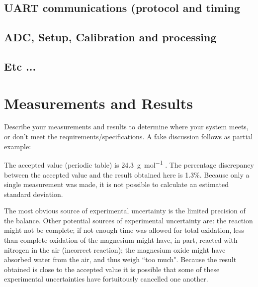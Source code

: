 \documentclass[11pt,a4paper]{article}
\begin{document}
	\subsection{UART communications (protocol and timing}
	\subsection{ADC, Setup, Calibration and processing}
	\subsection{Etc ...}
	
	
	
	\section{Measurements and Results}
	
	Describe your measurements and results to determine where your system meets, or don't meet the requirements/specifications. A fake discussion follows as partial example:
	
	The accepted value (periodic table) is \SI{24.3}{\gram\per\mole} \cite{Smith:2012qr}. The percentage discrepancy between the accepted value and the result obtained here is 1.3\%. Because only a single measurement was made, it is not possible to calculate an estimated standard deviation.
	
	The most obvious source of experimental uncertainty is the limited precision of the balance. Other potential sources of experimental uncertainty are: the reaction might not be complete; if not enough time was allowed for total oxidation, less than complete oxidation of the magnesium might have, in part, reacted with nitrogen in the air (incorrect reaction); the magnesium oxide might have absorbed water from the air, and thus weigh ``too much". Because the result obtained is close to the accepted value it is possible that some of these experimental uncertainties have fortuitously cancelled one another.
	
	
\end{document}
